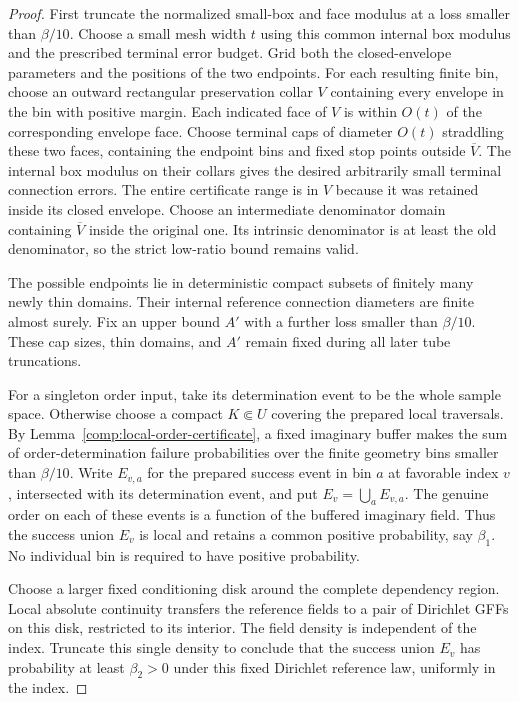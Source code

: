 \begin{proof}
First truncate the normalized small-box and face modulus at
a loss smaller than $\beta/10$.  Choose a small mesh width $t$
using this common internal box modulus and the prescribed terminal
error budget.  Grid both the closed-envelope parameters and the
positions of the two endpoints.  For each resulting finite bin,
choose an outward rectangular preservation collar $V$ containing
every envelope in the bin with positive margin.  Each indicated
face of $V$ is within $O(t)$ of the corresponding envelope face.
Choose terminal caps of diameter $O(t)$ straddling these two faces,
containing the endpoint bins and fixed stop points outside
$\overline V$.  The internal box modulus on their collars gives
the desired arbitrarily small terminal connection errors.
The entire certificate range is in $V$ because it was retained
inside its closed envelope.  Choose an intermediate denominator
domain containing $\overline V$ inside the original one.
Its intrinsic denominator is at least the old denominator, so the
strict low-ratio bound remains valid.

The possible endpoints lie in deterministic compact subsets
of finitely many newly thin domains.  Their internal reference
connection diameters are finite almost surely.  Fix an upper
bound $A'$ with a further loss smaller than $\beta/10$.
These cap sizes, thin domains, and $A'$ remain fixed during
all later tube truncations.

For a singleton order input, take its determination event to be
the whole sample space.  Otherwise choose a compact $K\Subset U$
covering the prepared local traversals.  By
Lemma~\ref{comp:local-order-certificate}, a fixed imaginary buffer
makes the sum of order-determination failure probabilities over
the finite geometry bins smaller than $\beta/10$.
Write $E_{v,a}$ for the prepared success event in
bin $a$ at favorable index $v$, intersected with its determination
event, and put $E_v=\bigcup_a E_{v,a}$.  The genuine order on each
of these events is a function of the buffered imaginary field.
Thus the success union $E_v$ is local and retains a common positive
probability, say $\beta_1$.  No individual bin is required to have
positive probability.

Choose a larger fixed conditioning disk around the complete
dependency region.  Local absolute continuity transfers the
reference fields to a pair of Dirichlet GFFs on this disk,
restricted to its interior.  The field density is independent
of the index.  Truncate this single density to conclude that
the success union $E_v$ has probability at least
$\beta_2>0$ under this fixed Dirichlet reference law, uniformly
in the index.


\end{proof}
